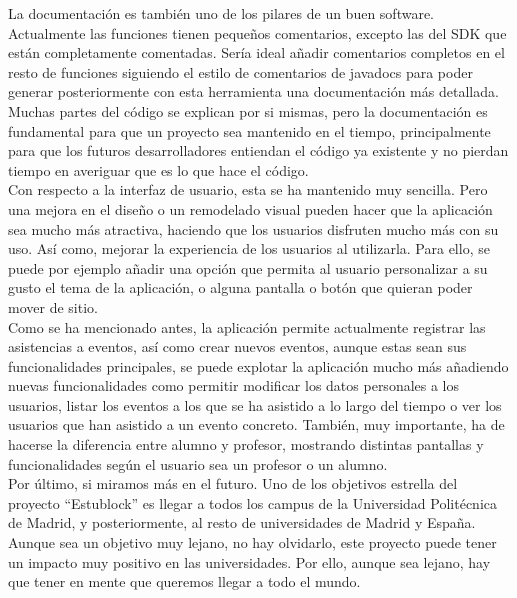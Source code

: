 La documentación es también uno de los pilares de un buen software. Actualmente las funciones tienen pequeños comentarios, excepto las del SDK que están completamente comentadas. Sería ideal añadir comentarios completos en el resto de funciones siguiendo el estilo de comentarios de javadocs para poder generar posteriormente con esta herramienta una documentación más detallada. Muchas partes del código se explican por si mismas, pero la documentación es fundamental para que un proyecto sea mantenido en el tiempo, principalmente para que los futuros desarrolladores entiendan el código ya existente y no pierdan tiempo en averiguar que es lo que hace el código. \\

Con respecto a la interfaz de usuario, esta se ha mantenido muy sencilla. Pero una mejora en el diseño o un remodelado visual pueden hacer que la aplicación sea mucho más atractiva, haciendo que los usuarios disfruten mucho más con su uso. Así como, mejorar la experiencia de los usuarios al utilizarla. Para ello, se puede por ejemplo añadir una opción que permita al usuario personalizar a su gusto el tema de la aplicación, o alguna pantalla o botón que quieran poder mover de sitio. \\

Como se ha mencionado antes, la aplicación permite actualmente registrar las asistencias a eventos, así como crear nuevos eventos, aunque estas sean sus funcionalidades principales, se puede explotar la aplicación mucho más añadiendo nuevas funcionalidades como permitir modificar los datos personales a los usuarios, listar los eventos a los que se ha asistido a lo largo del tiempo o ver los usuarios que han asistido a un evento concreto. También, muy importante, ha de hacerse la diferencia entre alumno y profesor, mostrando distintas pantallas y funcionalidades según el usuario sea un profesor o un alumno. \\

Por último, si miramos más en el futuro. Uno de los objetivos estrella del proyecto ``Estublock'' es llegar a todos los campus de la Universidad Politécnica de Madrid, y posteriormente, al resto de universidades de Madrid y España. Aunque sea un objetivo muy lejano, no hay olvidarlo, este proyecto puede tener un impacto muy positivo en las universidades. Por ello, aunque sea lejano, hay que tener en mente que queremos llegar a todo el mundo. 
